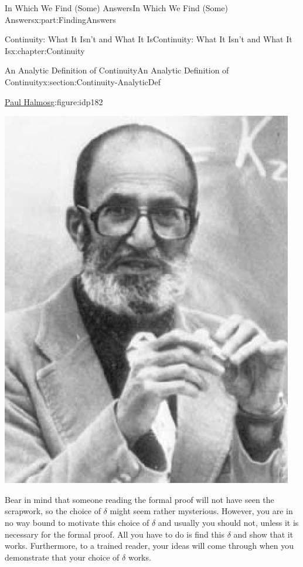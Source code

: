 \documentclass[oneside,10pt,]{book}
\numberwithin{equation}{section}
\begin{document}
\begin{partptx}{In Which We Find (Some) Answers}{}{In Which We Find (Some) Answers}{}{}{x:part:FindingAnswers}
\begin{chapterptx}{Continuity: What It Isn't and What It Is}{}{Continuity: What It Isn't and What It Is}{}{}{x:chapter:Continuity}
\begin{sectionptx}{An Analytic Definition of Continuity}{}{An Analytic Definition of Continuity}{}{}{x:section:Continuity-AnalyticDef}
\begin{figureptx}{\href{https://mathshistory.st-andrews.ac.uk/Biographies/Halmos/}{Paul Halmos}\protect\footnotemark{}}{g:figure:idp182}{}
\begin{image}{0.325}{0.35}{0.325}
\includegraphics[width=\linewidth]{images/Halmos.png}
\end{image}%
\tcblower
\end{figureptx}%
%
Bear in mind that someone reading the formal proof will not have seen the scrapwork, so the choice of \(\delta\) might seem rather mysterious.  However, you are in no way bound to motivate this choice of \(\delta\) and usually you should not, unless it is necessary for the formal proof.  All you have to do is find this \(\delta\) and show that it works.  Furthermore, to a trained reader, your ideas will come through when you demonstrate that your choice of \(\delta\) works.%
\par

\end{sectionptx}
\end{chapterptx}
\end{partptx}
\end{document}
